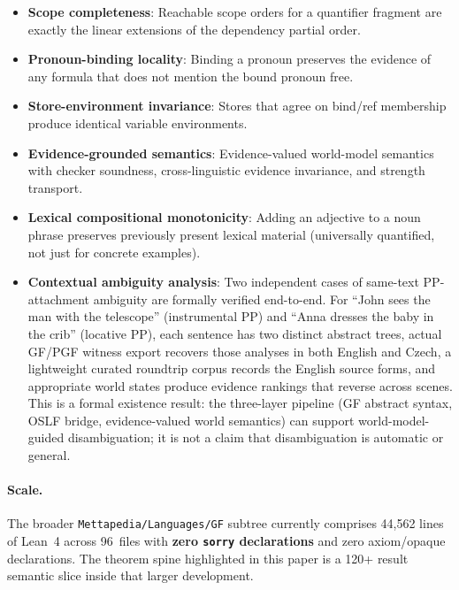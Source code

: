 \documentclass[11pt]{article}
\newcommand{\code}[1]{\texttt{#1}}
\newcommand{\GF}{\textup{GF}}
\begin{document}
\begin{itemize}
\item \textbf{Scope completeness}: Reachable scope orders for a
  quantifier fragment are exactly the linear extensions of the
  dependency partial order.
\item \textbf{Pronoun-binding locality}: Binding a pronoun preserves
  the evidence of any formula that does not mention the bound pronoun free.
\item \textbf{Store-environment invariance}: Stores that agree on
  bind/ref membership produce identical variable environments.
\item \textbf{Evidence-grounded semantics}: Evidence-valued world-model
  semantics with checker soundness, cross-linguistic evidence invariance,
  and strength transport.
\item \textbf{Lexical compositional monotonicity}: Adding an adjective
  to a noun phrase preserves previously present lexical material
  (universally quantified, not just for concrete examples).
\item \textbf{Contextual ambiguity analysis}: Two independent cases of
  same-text PP-attachment ambiguity are formally verified end-to-end.
  For ``John sees the man with the telescope'' (instrumental PP) and
  ``Anna dresses the baby in the crib'' (locative PP), each sentence has
  two distinct abstract trees, actual \GF{}/PGF witness export recovers those
  analyses in both English and Czech, a lightweight curated roundtrip corpus
  records the English source forms, and appropriate world states produce
  evidence rankings that reverse across scenes.  This is a formal existence
  result: the three-layer pipeline (GF abstract syntax, OSLF bridge,
  evidence-valued world semantics) can support world-model-guided
  disambiguation; it is not a claim that disambiguation is automatic or general.
\end{itemize}

\paragraph{Scale.}  The broader \code{Mettapedia/Languages/GF} subtree currently
comprises 44,562 lines of Lean~4 across 96~files with
\textbf{zero \code{sorry} declarations} and zero axiom/opaque declarations.
The theorem spine highlighted in this paper is a 120+ result semantic slice
inside that larger development.
\end{document}
